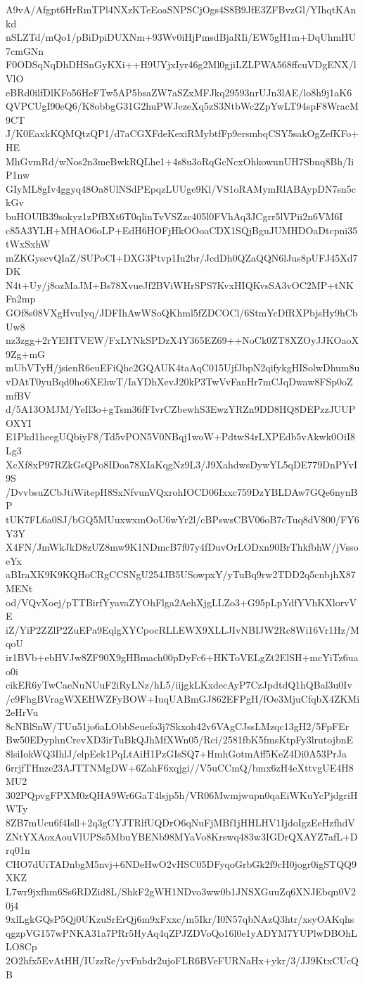 A9vA/Afgpt6HrRmTPl4NXzKTeEoaSNPSCjOgs4S8B9JfE3ZFBvzGl/YIhqtKAnkd
nSLZTd/mQo1/pBiDpiDUXNm+93Wv0iHjPmsdBjaRIi/EW5gH1m+DqUhmHU7cmGNn
F0ODSqNqDhDHSnGyKXi++H9UYjxIyr46g2Ml0gjiLZLPWA568ffcuVDgENX/lVlO
eBRd0ilfDlKFo56HeFTw5AP5bsaZW7aSZxMFJkq29593nrUJn3lAE/lo8h9j1aK6
QVPCUgI90eQ6/K8obbgG31G2huPWJezeXq5zS3NtbWc2ZpYwLT94spF8WracM9CT
J/K0EaxkKQMQtzQP1/d7aCGXFdeKexiRMybtfFp9ersmbqCSY5sakOgZefKFo+HE
MhGvmRd/wNos2n3meBwkRQLhe1+4s8u3oRqGcNcxOhkownnUH7Sbnq8Bh/IiP1nw
GIyML8gIv4ggyq48Oa8UlNSdPEpqzLUUge9Kl/VS1oRAMymRlABAypDN7sn5ckGv
buHOUlB39sokyz1zPfBXt6T0qlinTvVSZzc405l0FVhAq3JCgrr5lVPii2n6VM6I
c85A3YLH+MHAO6oLP+EdH6HOFjHkOOoaCDX1SQjBguJUMHDOaDtcpni35tWxSxhW
mZKGyscvQIaZ/SUPoCI+DXG3Ptvp1Iu2br/JcdDh0QZaQQN6lJus8pUFJ45Xd7DK
N4t+Uy/j8ozMaJM+Bs78XvueJf2BViWHrSPS7KvxHIQKvsSA3vOC2MP+tNKFn2mp
GOf8s08VXgHvuIyq/JDFIhAwWSoQKhml5fZDCOCl/6StmYcDfRXPbjsHy9hCbUw8
nz3zgg+2rYEHTVEW/FxLYNkSPDzX4Y365EZ69++NoCk0ZT8XZOyJJKOaoX9Zg+mG
mUbVTyH/jsienR6euEFiQhc2GQAUK4taAqC015UjfJbpN2qifykgHISolwDhum8u
vDAtT0yuBqd0ho6XEhwT/IaYDhXevJ20kP3TwVvFanHr7mCJqDwaw8FSp0oZmfBV
d/5A13OMJM/YeIl3o+gTsm36fFIvrCZbewhS3EwzYRZn9DD8HQ8DEPzzJUUPOXYI
E1Pkd1heegUQbiyF8/Td5vPON5V0NBqj1woW+PdtwS4rLXPEdb5vAkwk0OiI8Lg3
XcXf8xP97RZkGsQPo8IDoa78XIaKqgNz9L3/J9XahdwsDywYL5qDE779DnPYvI9S
/DvvbsuZCbJtiWitepH8SxNfvunVQxrohIOCD06Ixxc759DzYBLDAw7GQe6nynBP
tUK7FL6a0SJ/bGQ5MUuxwxmOoU6wYr2l/cBPswsCBV06oB7cTuq8dV800/FY6Y3Y
X4FN/JmWkJkD8zUZ8mw9K1NDmcB7f07y4fDuvOrLODxn90BrThkfbhW/jVssoeYx
aBIraXK9K9KQHoCRgCCSNgU254JB5USowpxY/yTuBq9rw2TDD2q5cnbjhX87MENt
od/VQvXoej/pTTBirfYyavaZYOhFlga2AehXjgLLZo3+G95pLpYdfYVhKXlorvVE
iZ/YiP2ZZlP2ZuEPa9EqlgXYCpocRLLEWX9XLLJIvNBIJW2Rc8Wi16Vr1Hz/MqoU
ir1BVb+ebHVJw8ZF90X9gHBmach00pDyFc6+HKToVELgZt2ElSH+mcYiTz6uao0i
cikER6yTwCaeNuNUuF2iRyLNz/hL5/iijgkLKxdecAyP7CzJpdtdQ1hQBal3u0Iv
/c9FhgBVragWXEHWZFyBOW+IuqUABmGJ862EFPgH/fOe3MjuCfqbX4ZKMi2eHrVu
8cNBlSnW/TUu51jo6aLObbSeuefo3j7Skxoh42v6VAgCJssLMzqc13gH2/5FpFEr
Bw50EDyphnCrevXD3irTuBkQJhMfXWn05/Rci/2581fbK5fmsKtpFy3lrutojbnE
8lsiIokWQ3IhlJ/elpEek1PqLtAiH1PzGIsSQ7+HmhGotmAff5KeZ4Di0A53PrJa
6rrjfTHnze23AJTTNMgDW+6ZahF6xqjgi//V5uCCmQ/bmx6zH4eXttvgUE4H8MU2
302PQpvgFPXM0zQHA9Wr6GaT4lsjp5h/VR06Mwmjwupn0qaEiWKuYcPjdgriHWTy
8ZB7mUcu6f4Isll+2q3gCYJTRlfUQDrO6qNuFjMBf1jHHLHV1IjdoIgzEeHzfhdV
ZNtYXAoxAouVlUPSs5MbuYBENb98MYaVo8Krswq483w3IGDrQXAYZ7afL+Drq01n
CHO7dUiTADnbgM5nvj+6NDeHwO2vHSC05DFyqoGrbGk2f9cH0jogr0igSTQQ9XKZ
L7wr9jxfhm6Ss6RDZid8L/ShkF2gWH1NDvo3ww0b1JNSXGuuZq6XNJEbqn0V20j4
9xlLgkGQsP5Qj0UKzuSrErQj6m9xFxxc/m5Ikr/I0N57qbNAzQ3htr/xsyOAKqhs
qgzpVG157wPNKA31a7PRr5HyAq4qZPJZDVoQo16l0e1yADYM7YUPlwDBOhLLO8Cp
2O2hfx5EvAtHH/IUzzRe/yvFnbdr2ujoFLR6BVeFURNaHx+ykr/3/JJ9KtxCUcQB
